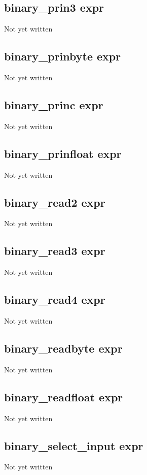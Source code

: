 \documentclass[a4paper,11pt]{article}
\begin{document}
{\subsection{\ttfamily binary\_prin3 expr}
Not yet written

\subsection{\ttfamily binary\_prinbyte expr}
Not yet written

\subsection{\ttfamily binary\_princ expr}
Not yet written

\subsection{\ttfamily binary\_prinfloat expr}
Not yet written

\subsection{\ttfamily binary\_read2 expr}
Not yet written

\subsection{\ttfamily binary\_read3 expr}
Not yet written

\subsection{\ttfamily binary\_read4 expr}
Not yet written

\subsection{\ttfamily binary\_readbyte expr}
Not yet written

\subsection{\ttfamily binary\_readfloat expr}
Not yet written

\subsection{\ttfamily binary\_select\_input expr}
Not yet written

}
\end{document}

